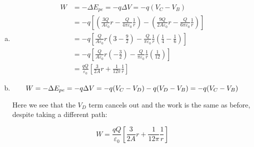 \documentclass{article}
\begin{document}
\begin{enumerate}[(a)]
    \item
    \begin{equation*}
    \begin{aligned}
    W &= -\Delta E_{pe} = -q\Delta V = -q(V_C - V_B) \\
    &= -q\left[\left(\frac{3Q}{A\varepsilon_0}r - \frac{Q}{4 \pi\varepsilon_0}\frac{1}{r}\right) - \left(\frac{9Q}{2A\varepsilon_0}r - \frac{Q}{6 \pi\varepsilon_0}\frac{1}{r}\right) \right] \\
    &= -q\left[\frac{Q}{A\varepsilon_0}r\left(3 - \frac{9}{2}\right) - \frac{Q}{\pi\varepsilon_0}\frac{1}{r}\left(\frac{1}{4}-\frac{1}{6}\right) \right] \\
    &= -q\left[\frac{Q}{A\varepsilon_0}r\left(- \frac{3}{2}\right) - \frac{Q}{\pi\varepsilon_0}\frac{1}{r}\left(\frac{1}{12}\right) \right] \\
    &= \frac{qQ}{\varepsilon_0}\left[\frac{3}{2A}r + \frac{1}{12\pi}\frac{1}{r}\right]
    \end{aligned}
    \end{equation*}

    \item
    \begin{equation*}
    W = -\Delta E_{pe} = -q\Delta V = -q(V_C - V_D) - q(V_D - V_B) = -q(V_C - V_B) \\
    \end{equation*}

    Here we see that the $V_D$ term cancels out and the work is the same as before, despite taking a different path:

    \begin{equation*}
    W = \frac{qQ}{\varepsilon_0}\left[\frac{3}{2A}r + \frac{1}{12\pi}\frac{1}{r}\right]
    \end{equation*}
\end{enumerate}
\end{document}
